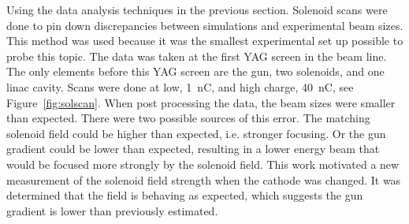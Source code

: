 Using the data analysis techniques in the previous section. 
Solenoid scans were done to pin down discrepancies between 
simulations and experimental beam sizes. 
This method was used because it was the smallest experimental 
set up possible to probe this topic.
The data was taken at the first YAG screen in the beam line.
The only elements before this YAG screen are the gun, two solenoids, 
and one linac cavity. 
Scans were done at low, \SI{1}{nC}, and high charge, \SI{40}{nC}, see Figure~\ref{fig:solscan}. 
When post processing the data, the beam sizes were smaller than expected.
There were two possible sources of this error. 
The matching solenoid field could be higher than expected, i.e. stronger focusing.
Or the gun gradient could be lower than expected, resulting in a lower energy 
beam that would be focused more strongly by the solenoid field.
This work motivated a new measurement of the solenoid field strength when 
the cathode was changed. It was determined that the field is behaving as expected, 
which suggests the gun gradient is lower than previously estimated.
